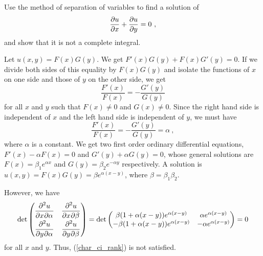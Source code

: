 \begin{egg}
Use the method of separation of variables to find a solution of
\[
\pdydx{u}{x} + \pdydx{u}{y} = 0 \ ,
\]
and show that it is not a complete integral.

Let $u(x,y) = F(x)G(y)$.  We get $F'(x) G(y) + F(x) G'(y) = 0$.  If we
divide both sides of this equality by $F(x)G(y)$ and isolate the
functions of $x$ on one side and those of $y$ on the other side, we
get
\[
\frac{F'(x)}{F(x)} = - \frac{G'(y)}{G(y)}
\]
for all $x$ and $y$ such that $F(x) \neq 0$ and $G(x) \neq 0$.  Since
the right hand side is independent of $x$ and the left hand side is
independent of $y$, we must have
\[
\frac{F'(x)}{F(x)} = - \frac{G'(y)}{G(y)} = \alpha \ ,
\]
where $\alpha$ is a constant.  We get two first order ordinary
differential equations, $F'(x) -\alpha F(x) = 0$ and
$G'(y) + \alpha G(y) = 0$,
whose general solutions are $F(x) = \beta_1 e^{\alpha x}$ and
$\displaystyle G(y) = \beta_2 e^{-\alpha y}$ respectively.  A solution is
$\displaystyle u(x,y) = F(x)G(y) = \beta e^{\alpha(x-y)}$, where
$\beta = \beta_1 \beta_2$.

However, we have
\[
\det
\begin{pmatrix}
\displaystyle \pdydxnm{u}{x}{\alpha}{2}{}{} &
\displaystyle \pdydxnm{u}{x}{\beta}{2}{}{} \\[0.7em]
\displaystyle \pdydxnm{u}{y}{\alpha}{2}{}{} &
\displaystyle \pdydxnm{u}{y}{\beta}{2}{}{}
\end{pmatrix}
= \det
\begin{pmatrix}
\beta (1+\alpha (x-y)) e^{\alpha(x-y)} & \alpha e^{\alpha(x-y)} \\
-\beta(1+\alpha (x-y)) e^{\alpha(x-y)} & -\alpha e^{\alpha(x-y)}
\end{pmatrix} = 0
\]
for all $x$ and $y$. Thus, (\ref{char_ci_rank}) is not satisfied.
\end{egg}

